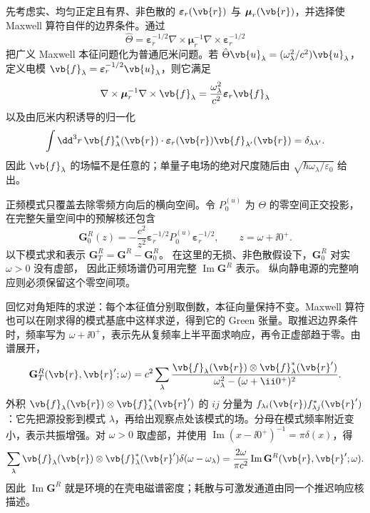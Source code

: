 先考虑实、均匀正定且有界、非色散的 $\boldsymbol\varepsilon_r(\vb{r})$ 与 $\boldsymbol\mu_r(\vb{r})$，并选择使 Maxwell 算符自伴的边界条件。通过
\[
\hat\Theta
=\boldsymbol\varepsilon_r^{-1/2}
\nabla\times\boldsymbol\mu_r^{-1}\nabla\times
\boldsymbol\varepsilon_r^{-1/2}
\]
把广义 Maxwell 本征问题化为普通厄米问题。若
$\hat\Theta\vb{u}_\lambda=(\omega_\lambda^2/c^2)\vb{u}_\lambda$，定义电模
$\vb{f}_\lambda=\boldsymbol\varepsilon_r^{-1/2}\vb{u}_\lambda$，则它满足
\[
\nabla\times\boldsymbol\mu_r^{-1}\nabla\times\vb{f}_\lambda
=\frac{\omega_\lambda^2}{c^2}\boldsymbol\varepsilon_r\vb{f}_\lambda
\]
以及由厄米内积诱导的归一化
\begin{equation}
{
\int\dd^3 r\,
\vb{f}_\lambda^*(\vb{r})\cdot
\boldsymbol\varepsilon_r(\vb{r})\vb{f}_{\lambda'}(\vb{r})
=\delta_{\lambda\lambda'}.}
\label{eq:lossless_electric_mode_normalization}
\end{equation}
因此 $\vb{f}_\lambda$ 的场幅不是任意的；单量子电场的绝对尺度随后由 $\sqrt{\hbar\omega_\lambda/\varepsilon_0}$ 给出。

正频模式只覆盖去除零频方向后的横向空间。令 $P_0^{(u)}$ 为 $\Theta$ 的零空间正交投影，
在完整矢量空间中的预解核还包含
\[
\mathbf G_0^R(z)=-\frac{c^2}{z^2}\boldsymbol\varepsilon_r^{-1/2}
P_0^{(u)}\boldsymbol\varepsilon_r^{-1/2},\qquad z=\omega+\ii0^+.
\]
以下模式求和表示 $\mathbf G_T^R=\mathbf G^R-\mathbf G_0^R$。
在这里的无损、非色散假设下，$\mathbf G_0^R$ 对实 $\omega>0$ 没有虚部，
因此正频场谱仍可用完整 $\operatorname{Im}\mathbf G^R$ 表示。
纵向静电源的完整响应则必须保留这个零空间项。

回忆对角矩阵的求逆：每个本征值分别取倒数，本征向量保持不变。Maxwell 算符也可以在刚求得的模式基底中这样求逆，得到它的 Green 张量。取推迟边界条件时，频率写为 $\omega+\ii0^+$，表示先从复频率上半平面求响应，再令正虚部趋于零。由谱展开，
\begin{equation}
{
\mathbf G_T^R(\vb{r},\vb{r}';\omega)
=c^2\sum_\lambda
\frac{\vb{f}_\lambda(\vb{r})\otimes\vb{f}_\lambda^*(\vb{r}')}
{\omega_\lambda^2-(\omega+\ii0^+)^2}.}
\label{eq:green_discrete_mode_spectral_representation}
\end{equation}
外积 $\vb{f}_\lambda(\vb{r})\otimes\vb{f}_\lambda^*(\vb{r}')$ 的 $ij$ 分量为 $f_{\lambda i}(\vb{r})f_{\lambda j}^*(\vb{r}')$：它先把源投影到模式 $\lambda$，再给出观察点处该模式的场。分母在模式频率附近变小，表示共振增强。对 $\omega>0$ 取虚部，并使用 $\operatorname{Im}(x-\ii0^+)^{-1}=\pi\delta(x)$，得
\begin{equation}
{
\sum_\lambda
\vb{f}_\lambda(\vb{r})\otimes\vb{f}_\lambda^*(\vb{r}')
\delta(\omega-\omega_\lambda)
=\frac{2\omega}{\pi c^2}
\operatorname{Im}\mathbf G^R(\vb{r},\vb{r}';\omega).}
\label{eq:mode_sum_imag_green_identity}
\end{equation}
因此 $\operatorname{Im}\mathbf G^R$ 就是环境的在壳电磁谱密度；耗散与可激发通道由同一个推迟响应核描述。


